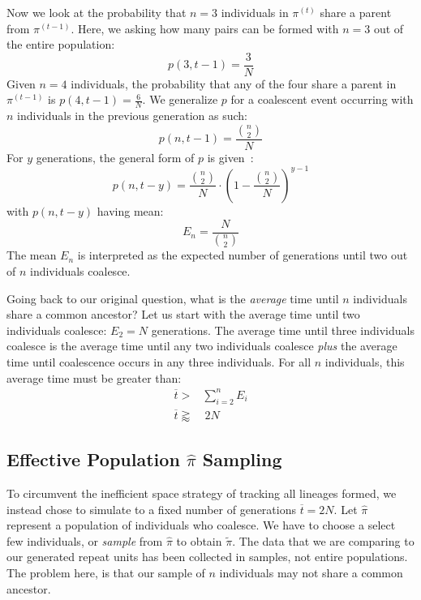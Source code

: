 Now we look at the probability that $n=3$ individuals in $\pi^{(t)}$ share a parent from $\pi^{(t-1)}$.
Here, we asking how many pairs can be formed with $n=3$ out of the entire population:
\begin{equation}
    p(3, t-1) = \frac{3}{N}
\end{equation}
Given $n=4$ individuals, the probability that any of the four share a parent in $\pi^{(t-1)}$ is
$p(4, t-1) = \frac{6}{N}$.
We generalize $p$ for a coalescent event occurring with $n$ individuals in the previous generation as such:
\begin{equation}
    p(n, t-1) = \frac{\binom{n}{2}}{N}
\end{equation}
For $y$ generations, the general form of $p$ is given~\cite{hudsonGeneGenealogiesCoalescent1990}:
\begin{equation}
    p(n, t-y) = \frac{\binom{n}{2}}{N} \cdot \left(1 - \frac{\binom{n}{2}}{N}\right)^{y-1}
\end{equation}
with $p(n, t-y)$ having mean:
\begin{equation}\label{eq:expectedMeanCoa}
    E_n = \frac{N}{\binom{n}{2}}
\end{equation}
The mean $E_n$ is interpreted as the expected number of generations until two out of $n$ individuals coalesce.

Going back to our original question, what is the \emph{average} time until $n$ individuals share a common ancestor?
Let us start with the average time until two individuals coalesce: $E_2 = N$ generations.
The average time until three individuals coalesce is the average time until any two individuals coalesce \emph{plus} the
average time until coalescence occurs in any three individuals.
For all $n$ individuals, this average time must be greater than:
\begin{equation}
    \begin{aligned}
        \overbar{t} >& \sum_{i=2}^{n} E_i \\
        \overbar{t} \gtrapprox& \ 2N
    \end{aligned}
\end{equation}

\subsection{Effective Population $\hat{\pi}$ Sampling}\label{subsec:effectivePopulationPiSampling}
To circumvent the inefficient space strategy of tracking all lineages formed, we instead chose to simulate to a fixed
number of generations $\overbar{t} = 2N$.
Let $\hat{\pi}$ represent a population of individuals who coalesce.
We have to choose a select few individuals, or \emph{sample} from $\hat{\pi}$ to obtain $\tilde{\pi}$.
The data that we are comparing to our generated repeat units has been collected in samples, not entire populations.
The problem here, is that our sample of $n$ individuals may not share a common ancestor.

